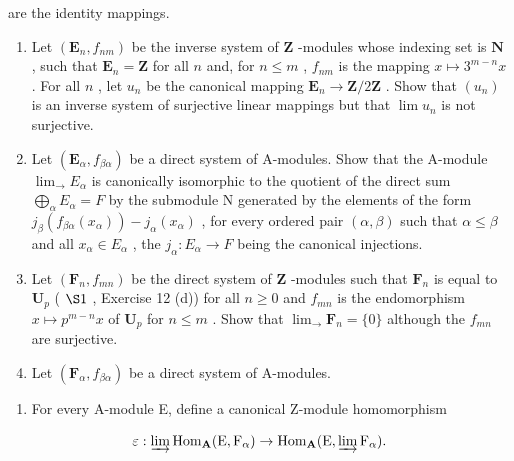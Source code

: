 are the identity mappings.

\BourbakiExercisesSection

\begin{enumerate}
\def\labelenumi{\arabic{enumi}.}
\item
  Let \((\mathbf{E}_n, f_{nm})\) be the inverse system of \(\mathbf{Z}\) -modules whose indexing set is \(\mathbf{N}\) , such that \(\mathbf{E}_n = \mathbf{Z}\) for all \(n\) and, for \(n \leqslant m\) , \(f_{nm}\) is the mapping \(x \mapsto 3^{m - n}x\) . For all \(n\) , let \(u_n\) be the canonical mapping \(\mathbf{E}_n \to \mathbf{Z}/2\mathbf{Z}\) . Show that \((u_n)\) is an inverse system of surjective linear mappings but that \(\lim u_n\) is not surjective.
\item
  Let \((\mathbf{E}_{\alpha}, f_{\beta\alpha})\) be a direct system of A-modules. Show that the A-module \(\lim_{\rightarrow} E_{\alpha}\) is canonically isomorphic to the quotient of the direct sum \(\bigoplus_{\alpha} E_{\alpha} = F\) by the submodule N generated by the elements of the form \(j_{\beta}(f_{\beta\alpha}(x_{\alpha})) - j_{\alpha}(x_{\alpha})\) , for every ordered pair \((\alpha, \beta)\) such that \(\alpha \leqslant \beta\) and all \(x_{\alpha} \in E_{\alpha}\) , the \(j_{\alpha}: E_{\alpha} \to F\) being the canonical injections.
\item
  Let \((\mathbf{F}_n, f_{mn})\) be the direct system of \(\mathbf{Z}\) -modules such that \(\mathbf{F}_n\) is equal to \(\mathbf{U}_p\) ( \(\S 1\) , Exercise 12 (d)) for all \(n \geqslant 0\) and \(f_{mn}\) is the endomorphism \(x \mapsto p^{m-n}x\) of \(\mathbf{U}_p\) for \(n \leqslant m\) . Show that \(\lim_{\longrightarrow} \mathbf{F}_n = \{0\}\) although the \(f_{mn}\) are surjective.
\item
  Let \((\mathbf{F}_{\alpha}, f_{\beta \alpha})\) be a direct system of A-modules.
\end{enumerate}

\begin{enumerate}
\def\labelenumi{(\alph{enumi})}
\tightlist
\item
  For every A-module E, define a canonical Z-module homomorphism
\end{enumerate}

\[
\varepsilon : \varinjlim \operatorname{Hom} _ {\mathbf {A}} (\mathrm{E}, \mathrm{F} _ {\alpha}) \rightarrow \operatorname{Hom} _ {\mathbf {A}} (\mathrm{E}, \varinjlim \mathrm{F} _ {\alpha}).
\]

